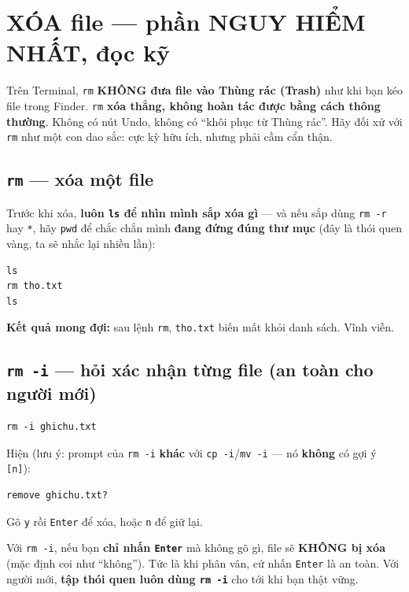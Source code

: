 \documentclass[12pt,a4paper]{article}
\newcommand{\cmd}[1]{\texttt{#1}}
\begin{document}
\section{XÓA file --- phần NGUY HIỂM NHẤT, đọc kỹ}

\begin{dangerbox}[title={CẢNH BÁO LỚN NHẤT CỦA CẢ CHƯƠNG}]
Trên Terminal, \cmd{rm} \textbf{KHÔNG đưa file vào Thùng rác (Trash)} như khi bạn kéo file trong Finder. \cmd{rm} \textbf{xóa thẳng, không hoàn tác được bằng cách thông thường}. Không có nút Undo, không có ``khôi phục từ Thùng rác''. Hãy đối xử với \cmd{rm} như một con dao sắc: cực kỳ hữu ích, nhưng phải cầm cẩn thận.
\end{dangerbox}

\subsection{\texttt{rm} --- xóa một file}

Trước khi xóa, \textbf{luôn \cmd{ls} để nhìn mình sắp xóa gì} --- và nếu sắp dùng \cmd{rm -r} hay \cmd{*}, hãy \cmd{pwd} để chắc chắn mình \textbf{đang đứng đúng thư mục} (đây là thói quen vàng, ta sẽ nhắc lại nhiều lần):

\begin{Verbatim}
ls
rm tho.txt
ls
\end{Verbatim}

\textbf{Kết quả mong đợi:} sau lệnh \cmd{rm}, \cmd{tho.txt} biến mất khỏi danh sách. Vĩnh viễn.

\subsection{\texttt{rm -i} --- hỏi xác nhận từng file (an toàn cho người mới)}

\begin{Verbatim}
rm -i ghichu.txt
\end{Verbatim}

Hiện (lưu ý: prompt của \cmd{rm -i} \textbf{khác} với \cmd{cp -i}/\cmd{mv -i} --- nó \textbf{không} có gợi ý \cmd{[n]}):
\begin{Verbatim}
remove ghichu.txt?
\end{Verbatim}

Gõ \cmd{y} rồi \cmd{Enter} để xóa, hoặc \cmd{n} để giữ lại.

\begin{notebox}[title={Trấn an quan trọng}]
Với \cmd{rm -i}, nếu bạn \textbf{chỉ nhấn \cmd{Enter}} mà không gõ gì, file sẽ \textbf{KHÔNG bị xóa} (mặc định coi như ``không''). Tức là khi phân vân, cứ nhấn \cmd{Enter} là an toàn. Với người mới, \textbf{tập thói quen luôn dùng \cmd{rm -i}} cho tới khi bạn thật vững.
\end{notebox}
\end{document}
